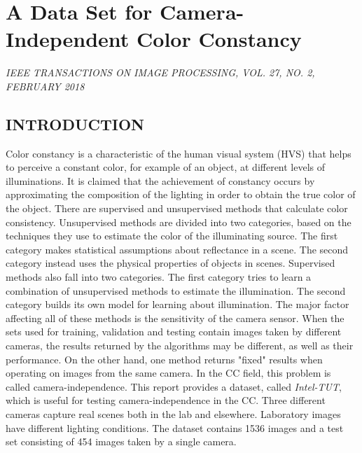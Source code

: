 \section{A Data Set for Camera-Independent Color Constancy}

\begin{flushleft}
    \author{
    Ça$ \breve{g} $lar Aytekin, 
    Jarno Nikkanen, 
    Moncef Gabbouj
    \emph{Fellow, IEEE}
    }
\end{flushleft}

\begin{center}
    \emph{IEEE TRANSACTIONS ON IMAGE PROCESSING, VOL. 27, NO. 2, FEBRUARY 2018}
\end{center}

\subsection{INTRODUCTION}
Color constancy is a characteristic of the human visual system (HVS) that 
helps to perceive a constant color, for example of an object, at different levels 
of illuminations. It is claimed that the achievement of constancy occurs by 
approximating the composition of the lighting in order to obtain the true 
color of the object. There are supervised and unsupervised methods 
that calculate color consistency. Unsupervised methods are divided into two 
categories, based on the techniques they use to estimate the color of 
the illuminating source. The first category makes statistical assumptions 
about reflectance in a scene. The second category instead uses the physical 
properties of objects in scenes. Supervised methods also fall into two categories. 
The first category tries to learn a combination of unsupervised methods to 
estimate the illumination. The second category builds its own model for 
learning about illumination. The major factor affecting all of these methods 
is the sensitivity of the camera sensor. When the sets used for training, 
validation and testing contain images taken by different cameras, the results 
returned by the algorithms may be different, as well as their performance. 
On the other hand, one method returns "fixed" results when operating on 
images from the same camera. In the CC field, this problem is called camera-independence.
This report provides a dataset, called \emph{Intel-TUT}, which is 
useful for testing camera-independence in the CC. Three different cameras 
capture real scenes both in the lab and elsewhere. Laboratory images have 
different lighting conditions. The dataset contains 1536 images and a test 
set consisting of 454 images taken by a single camera.

